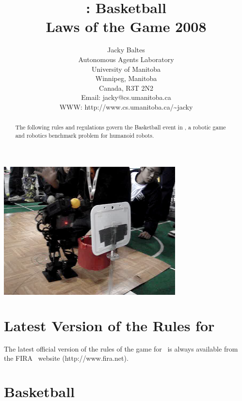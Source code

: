 \documentclass[12pt]{hurocup}
\begin{document}
\title{\HuroCup: Basketball\\
  Laws of the Game 2008}


\author{Jacky Baltes\\
Autonomous Agents Laboratory\\
University of Manitoba\\
Winnipeg, Manitoba\\
Canada, R3T 2N2\\
Email: jacky@cs.umanitoba.ca\\
WWW: http://www.cs.umanitoba.ca/\~{ }jacky
}

\maketitle

\begin{center}
  \includegraphics[width=0.7\textwidth]{Figures/basketball-life}
\end{center}

\begin{abstract}
The following rules and regulations govern the Basketball event in
\HuroCup, a robotic game and robotics benchmark problem for humanoid
robots.
%
\end{abstract}

\section*{Latest Version of the Rules for \HuroCup}
\label{sec:updates}

The latest official version of the rules of the game for \HuroCup\ is
always available from the FIRA \HuroCup\ website (http://www.fira.net).

\newpage

\section{Basketball}
\label{sec:basketball} 
\end{document}
